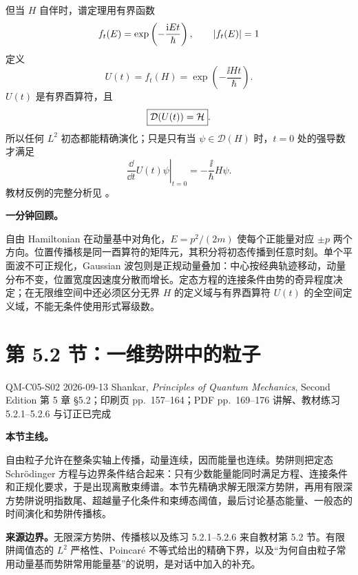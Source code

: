 但当 $H$ 自伴时，谱定理用有界函数
\begin{equation}
  f_t(E)=\exp\left(-\frac{\mathrm{i} Et}{\hbar}\right),
  \qquad \left|f_t(E)\right|=1
  \label{eq:QM-C05-S01-bounded-spectral-function}
\end{equation}
定义
\begin{equation}
  U(t)=f_t(H)=\exp\left(-\frac{\ii Ht}{\hbar}\right).
  \label{eq:QM-C05-S01-spectral-unitary}
\end{equation}
$U(t)$ 是有界酉算符，且
\begin{equation}
  \boxed{\mathcal D(U(t))=\mathcal{H}}.
  \label{eq:QM-C05-S01-u-domain}
\end{equation}
所以任何 $L^2$ 初态都能精确演化；只是只有当 $\psi\in\mathcal D(H)$ 时，$t=0$ 处的强导数才满足
\begin{equation}
  \left.\frac{\dd}{\dd t}U(t)\psi\right|_{t=0}
  =-\frac{\ii}{\hbar}H\psi.
  \label{eq:QM-C05-S01-strong-derivative-domain}
\end{equation}
教材反例的完整分析见
。

\textbf{一分钟回顾。}

自由 Hamiltonian 在动量基中对角化，$E=p^2/(2m)$ 使每个正能量对应 $\pm p$ 两个方向。位置传播核是同一酉算符的矩阵元，其积分将初态传播到任意时刻。单个平面波不可正规化，Gaussian 波包则是正规动量叠加：中心按经典轨迹移动，动量分布不变，位置宽度因速度分散而增长。定态方程的连接条件由势的奇异程度决定；在无限维空间中还必须区分无界 $H$ 的定义域与有界酉算符 $U(t)$ 的全空间定义域，不能无条件使用形式幂级数。

\section{第 5.2 节：一维势阱中的粒子}
\label{section:QM-C05-S02}

\studymeta
  {QM-C05-S02}
  {2026-09-13}
  {Shankar, \textit{Principles of Quantum Mechanics}, Second Edition}
  {第 5 章 \S 5.2；印刷页 pp.~157--164；PDF pp.~169--176}
  {讲解、教材练习 5.2.1--5.2.6 与订正已完成}

\textbf{本节主线。}

自由粒子允许在整条实轴上传播，动量连续，因而能量也连续。势阱则把定态 Schr\"odinger 方程与边界条件结合起来：只有少数能量能同时满足方程、连接条件和正规化要求，于是出现离散束缚谱。本节先精确求解无限深方势阱，再用有限深方势阱说明指数尾、超越量子化条件和束缚态阈值，最后讨论基态能量、一般态的时间演化和势阱传播核。

\textbf{来源边界。}无限深方势阱、传播核以及练习 5.2.1--5.2.6 来自教材第 5.2 节。有限阱阈值态的 $L^2$ 严格性、Poincar\'e 不等式给出的精确下界，以及“为何自由粒子常用动量基而势阱常用能量基”的说明，是对话中加入的补充。

